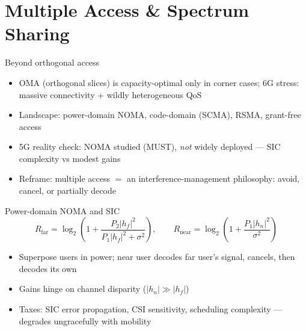 \section{Multiple Access \& Spectrum Sharing}

\begin{frame}{Beyond orthogonal access}
  \begin{itemize}\itemsep2pt
    \item OMA (orthogonal slices) is capacity-optimal only in corner cases;
          6G stress: massive connectivity + wildly heterogeneous QoS
    \item Landscape: power-domain NOMA, code-domain (SCMA), \alert{RSMA},
          grant-free access
    \item 5G reality check: NOMA studied (MUST), \emph{not} widely deployed ---
          SIC complexity vs modest gains
    \item Reframe: multiple access $=$ an \alert{interference-management
          philosophy}: avoid, cancel, or partially decode
  \end{itemize}
\end{frame}

\begin{frame}{Power-domain NOMA and SIC}
  \begin{equation*}
    R_{\mathrm{far}}=\log_2\!\left(1+
      \frac{P_2|h_f|^2}{P_1|h_f|^2+\sigma^2}\right),
    \qquad
    R_{\mathrm{near}}=\log_2\!\left(1+\frac{P_1|h_n|^2}{\sigma^2}\right)
  \end{equation*}
  \begin{itemize}\itemsep2pt
    \item Superpose users in power; near user decodes far user's signal,
          \alert{cancels}, then decodes its own
    \item Gains hinge on channel disparity ($|h_n|\gg|h_f|$)
    \item Taxes: SIC error propagation, CSI sensitivity, scheduling
          complexity --- degrades ungracefully with mobility
  \end{itemize}
\end{frame}

